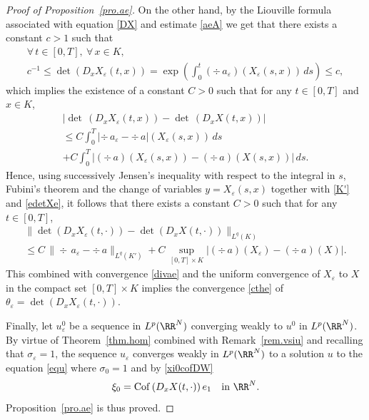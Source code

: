 \begin{proof}[Proof of Proposition~\ref{pro.ae}]
On the other hand, by the Liouville formula associated with equation \eqref{DX} and estimate \eqref{aeA} we get that there exists a constant $c>1$ such that
\begin{multline}\label{edetXe}
\forall\,t\in[0,T],\ \forall\,x\in K,\\[-5pt]
c^{-1}\leq \det\left(D_xX_\varepsilon(t,x)\right)=\exp\left(\int_0^t (\div\,a_\varepsilon)(X_\varepsilon(s,x))\,ds\right)\leq c,
\end{multline}
which implies the existence of a constant $C>0$ such that for any $t\in[0,T]$ and $x\in K$,
\begin{multline*}
\big|\det\,(D_xX_\varepsilon(t,x))-\det\,(D_xX(t,x))\big|
\\
\leq C\int_0^T\!\!|\div\,a_\varepsilon-\div\,a|(X_\varepsilon(s,x))\,ds\\[-5pt]
+C\int_0^T\!\!\big|(\div\,a)(X_\varepsilon(s,x))-(\div\,a)(X(s,x))\big|\,ds.
\end{multline*}
Hence, using successively Jensen's inequality with respect to the integral in $s$, Fubini's theorem and the change of variables $y=X_\varepsilon(s,x)$ together with \eqref{K'} and \eqref{edetXe}, it follows that there exists a constant $C>0$ such that for any $t\in[0,T]$,
\begin{multline*}
\big\|\det\left(D_x X_\varepsilon(t,\cdot)\right)-\det\left(D_x X(t,\cdot)\right)\big\|_{L^q(K)}
\\
\leq C\,\|\div\,a_\varepsilon-\div\,a\|_{L^q(K')}+C\,\sup_{[0,T]\times K}\big|(\div\,a)(X_\varepsilon)-(\div\,a)(X)\big|.
\end{multline*}
This combined with convergence \eqref{divae} and the uniform convergence of $X_\varepsilon$ to $X$ in the compact set $[0,T]\times K$ implies the convergence \eqref{cthe} of $\theta_\varepsilon=\det (D_xX_\varepsilon(t,\cdot))$.

Finally, let $u_\varepsilon^0$ be a sequence in $L^p(\RR^N)$ converging weakly to $u^0$ in $L^p(\RR^N)$. By virtue of Theorem~\ref{thm.hom} combined with Remark~\ref{rem.vsiu} and recalling that $\sigma_\varepsilon=1$, the sequence $u_\varepsilon$ converges weakly in $L^p(\RR^N)$ to a solution $u$ to the equation \eqref{equ} where $\sigma_0=1$ and by \eqref{xi0cofDW}
\[
\xi_0={\rm Cof}\,(D_x X(t,\cdot))\,e_1\quad\mbox{in }\RR^N.
\]
Proposition~\ref{pro.ae} is thus proved.
\end{proof}


